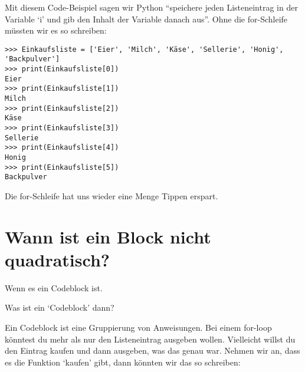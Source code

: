 Mit diesem Code-Beispiel sagen wir Python ``speichere jeden Listeneintrag in der Variable `i' und gib den Inhalt der Variable danach aus''. Ohne die for-Schleife müssten wir es so schreiben:

\begin{Verbatim}[frame=single]
>>> Einkaufsliste = ['Eier', 'Milch', 'Käse', 'Sellerie', 'Honig', 'Backpulver']
>>> print(Einkaufsliste[0])
Eier
>>> print(Einkaufsliste[1])
Milch
>>> print(Einkaufsliste[2])
Käse
>>> print(Einkaufsliste[3])
Sellerie
>>> print(Einkaufsliste[4])
Honig
>>> print(Einkaufsliste[5])
Backpulver
\end{Verbatim}

Die for-Schleife hat uns wieder eine Menge Tippen erspart.

\section{Wann ist ein Block nicht quadratisch?}

Wenn es ein Codeblock ist.
\par
\noindent
Was ist ein `Codeblock' dann?
\par
Ein Codeblock ist eine Gruppierung von Anweisungen. Bei einem for-loop könntest du mehr als nur den Listeneintrag ausgeben wollen. Vielleicht willst du den Eintrag kaufen und dann ausgeben, was das genau war. Nehmen wir an, dass es die Funktion `kaufen' gibt, dann könnten wir das so schreiben:

